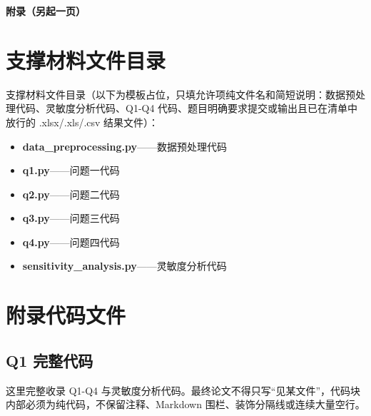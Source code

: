 \documentclass[12pt,a4paper]{article}
\newcommand{\appendixtitlefont}{\fontsize{12pt}{16pt}\selectfont\heiti\bfseries}
\begin{document}
\newpage
\begin{appendices}
\begin{center}
{\appendixtitlefont 附录（另起一页）}
\end{center}
\vspace{0.35em}

\section{支撑材料文件目录}

\par\noindent\hspace{2em}支撑材料文件目录（以下为模板占位，只填允许项纯文件名和简短说明：数据预处理代码、灵敏度分析代码、Q1-Q4 代码、题目明确要求提交或输出且已在清单中放行的 .xlsx/.xls/.csv 结果文件）：\par

\newcommand{\AppendixMaterialName}[1]{待替换文件#1}

\begin{itemize}[label={},leftmargin=1.9em,itemsep=0.25em,topsep=0.25em]
    \item \textbf{data\_preprocessing.py}——数据预处理代码
    \item \textbf{q1.py}——问题一代码
    \item \textbf{q2.py}——问题二代码
    \item \textbf{q3.py}——问题三代码
    \item \textbf{q4.py}——问题四代码
    \item \textbf{sensitivity\_analysis.py}——灵敏度分析代码
\end{itemize}

\section{附录代码文件}

\subsection{Q1 完整代码}

这里完整收录 Q1-Q4 与灵敏度分析代码。最终论文不得只写“见某文件”，代码块内部必须为纯代码，不保留注释、Markdown 围栏、装饰分隔线或连续大量空行。

\end{appendices}
\end{document}
